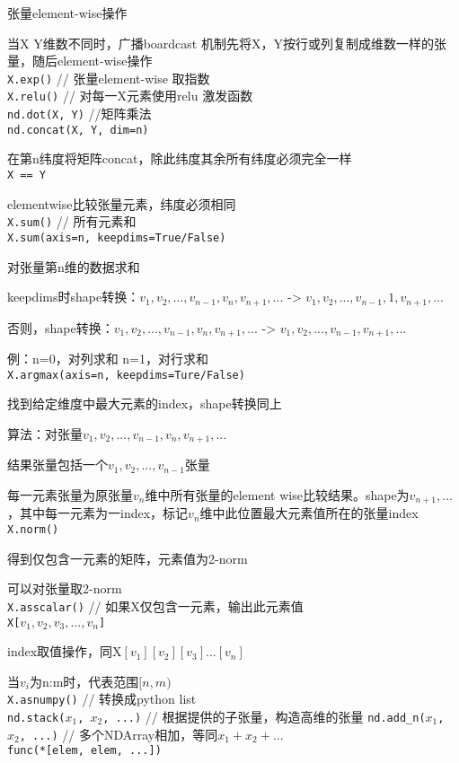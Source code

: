 \documentclass[UTF8]{ctexart}
\begin{document}
  张量element-wise操作
  
  当X Y维数不同时，广播boardcast 机制先将X，Y按行或列复制成维数一样的张量，随后element-wise操作\\
\texttt{X.exp()} // 张量element-wise 取指数\\
\texttt{X.relu()} // 对每一X元素使用relu 激发函数\\
\texttt{nd.dot(X, Y)} //矩阵乘法\\
\texttt{nd.concat(X, Y, dim=n)}

  在第n纬度将矩阵concat，除此纬度其余所有纬度必须完全一样\\
\texttt{X == Y} 

  elementwise比较张量元素，纬度必须相同\\
\texttt{X.sum()} // 所有元素和\\
\texttt{X.sum(axis=n, keepdims=True/False)}

  对张量第n维的数据求和
  
  keepdims时shape转换：$v_1, v_2, ..., v_{n-1}, v_n, v_{n+1}, ...$ -> $v_1, v_2, ..., v_{n-1}, 1, v_{n+1}, ...$

  否则，shape转换：$v_1, v_2, ..., v_{n-1}, v_n, v_{n+1}, ...$ -> $v_1, v_2, ..., v_{n-1}, v_{n+1}, ...$

  例：n=0，对列求和 n=1，对行求和\\
\texttt{X.argmax(axis=n, keepdims=Ture/False)}
  
  找到给定维度中最大元素的index，shape转换同上

  算法：对张量$v_1, v_2, ..., v_{n-1}, v_n, v_{n+1}, ...$

  \quad 结果张量包括一个$v_1, v_2, ..., v_{n-1}$张量

  \quad 每一元素张量为原张量$v_n$维中所有张量的element wise比较结果。shape为$v_{n+1}, ...$，其中每一元素为一index，标记$v_n$维中此位置最大元素值所在的张量index\\
\texttt{X.norm()}
 
  得到仅包含一元素的矩阵，元素值为2-norm

  可以对张量取2-norm\\
\texttt{X.asscalar()} // 如果X仅包含一元素，输出此元素值\\
\texttt{X[$v_1, v_2, v_3, ..., v_n$]}

  index取值操作，同X$[v_1][v_2][v_3]...[v_n]$

  当$v_i$为n:m时，代表范围$[n, m)$\\
\texttt{X.asnumpy()} // 转换成python list\\
\texttt{nd.stack($x_1$, $x_2$, ...)} // 根据提供的子张量，构造高维的张量
\texttt{nd.add\_n($x_1$, $x_2$, ...)} // 多个NDArray相加，等同$x_1 + x_2 + ...$\\
\texttt{func(*[elem, elem, ...])}
\end{document}
